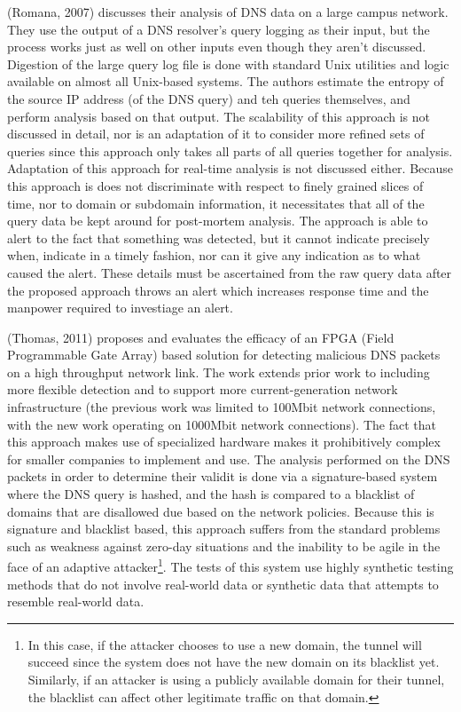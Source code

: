 \documentclass[12pt]{article}
\theoremstyle{remark}
\theoremstyle{definition}
\theoremstyle{definition}
\theoremstyle{definition}
\begin{document}
(Romana, 2007)\cite{Romana2007} discusses their analysis of DNS data on a large campus network. They use the output of a DNS resolver's query logging as their input, but the process works just as well on other inputs even though they aren't discussed. Digestion of the large query log file is done with standard Unix utilities and logic available on almost all Unix-based systems. The authors estimate the entropy of the source IP address (of the DNS query) and teh queries themselves, and perform analysis based on that output. The scalability of this approach is not discussed in detail, nor is an adaptation of it to consider more refined sets of queries since this approach only takes all parts of all queries together for analysis. Adaptation of this approach for real-time analysis is not discussed either. Because this approach is does not discriminate with respect to finely grained slices of time, nor to domain or subdomain information, it necessitates that all of the query data be kept around for post-mortem analysis. The approach is able to alert to the fact that something was detected, but it cannot indicate precisely when, indicate in a timely fashion, nor can it give any indication as to what caused the alert. These details must be ascertained from the raw query data after the proposed approach throws an alert which increases response time and the manpower required to investiage an alert.

(Thomas, 2011)\cite{Thomas2011} proposes and evaluates the efficacy of an FPGA (Field Programmable Gate Array) based solution for detecting malicious DNS packets on a high throughput network link. The work extends prior work to including more flexible detection and to support more current-generation network infrastructure (the previous work was limited to 100Mbit network connections, with the new work operating on 1000Mbit network connections). The fact that this approach makes use of specialized hardware makes it prohibitively complex for smaller companies to implement and use. The analysis performed on the DNS packets in order to determine their validit is done via a signature-based system where the DNS query is hashed, and the hash is compared to a blacklist of domains that are disallowed due based on the network policies. Because this is signature and blacklist based, this approach suffers from the standard problems such as weakness against zero-day situations and the inability to be agile in the face of an adaptive attacker\footnote{In this case, if the attacker chooses to use a new domain, the tunnel will succeed since the system does not have the new domain on its blacklist yet. Similarly, if an attacker is using a publicly available domain for their tunnel, the blacklist can affect other legitimate traffic on that domain.}. The tests of this system use highly synthetic testing methods that do not involve real-world data or synthetic data that attempts to resemble real-world data. 
\end{document}
